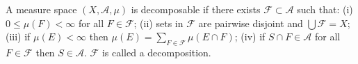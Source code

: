 A measure space $(X, \mathcal{A}, \mu)$ is decomposable if there exists $\mathcal{F} \subset \mathcal{A}$ such that: (i) $0 \leq \mu(F) < \infty$ for all $F \in \mathcal{F}$; (ii) sets in $\mathcal{F}$ are pairwise disjoint and $\bigcup \mathcal{F} = X$; (iii) if $\mu(E) < \infty$ then $\mu(E) = \sum_{F \in \mathcal{F}} \mu(E \cap F)$; (iv) if $S \cap F \in \mathcal{A}$ for all $F \in \mathcal{F}$ then $S \in \mathcal{A}$. $\mathcal{F}$ is called a decomposition.
